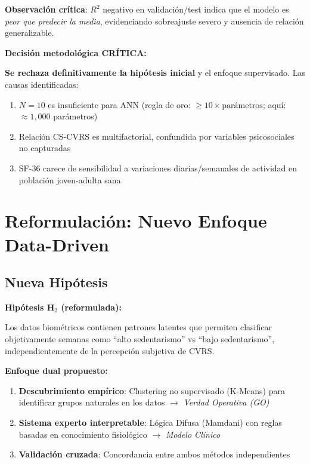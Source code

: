 \documentclass[12pt,letterpaper,twoside]{report}
\begin{document}
\begin{calculobox}
\begin{calculobox}
\textbf{Observación crítica}: $R^2$ negativo en validación/test indica que el modelo es \textit{peor que predecir la media}, evidenciando sobreajuste severo y ausencia de relación generalizable.
\end{calculobox}

\begin{decisionbox}
\textbf{Decisión metodológica CRÍTICA:}

\textbf{Se rechaza definitivamente la hipótesis inicial} y el enfoque supervisado. Las causas identificadas:
\begin{enumerate}[noitemsep]
    \item $N=10$ es insuficiente para ANN (regla de oro: $\geq 10 \times \text{parámetros}$; aquí: $\approx 1,000$ parámetros)
    \item Relación CS-CVRS es multifactorial, confundida por variables psicosociales no capturadas
    \item SF-36 carece de sensibilidad a variaciones diarias/semanales de actividad en población joven-adulta sana
\end{enumerate}
\end{decisionbox}

\section{Reformulación: Nuevo Enfoque Data-Driven}

\subsection{Nueva Hipótesis}

\begin{hipotesisbox}
\textbf{Hipótesis H$_2$ (reformulada):}

Los datos biométricos contienen patrones latentes que permiten clasificar objetivamente semanas como ``alto sedentarismo'' vs ``bajo sedentarismo'', independientemente de la percepción subjetiva de CVRS.

\textbf{Enfoque dual propuesto:}
\begin{enumerate}[noitemsep]
    \item \textbf{Descubrimiento empírico}: Clustering no supervisado (K-Means) para identificar grupos naturales en los datos $\to$ \textit{Verdad Operativa (GO)}
    \item \textbf{Sistema experto interpretable}: Lógica Difusa (Mamdani) con reglas basadas en conocimiento fisiológico $\to$ \textit{Modelo Clínico}
    \item \textbf{Validación cruzada}: Concordancia entre ambos métodos independientes
\end{enumerate}
\end{hipotesisbox}


\end{calculobox}
\end{document}
